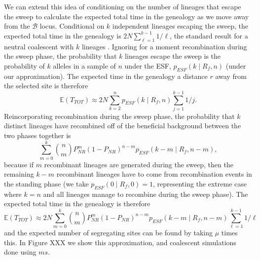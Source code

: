 \documentclass[a4paper,10pt]{article}
\newcommand{\fancyB}{$\mathcal B$ }
\begin{document}
We can extend this idea of conditioning on the number of lineages that escape the sweep to calculate the expected total time in the genealogy as we move away from the \fancyB locus. Conditional on  $k$ independent lineages escaping the sweep, the expected total time in the genealogy is $2N \sum_{\ell=1}^{k-1} 1/\ell$, the standard result for a neutral coalescent with $k$ lineages \citep{Watterson}. Ignoring for a moment recombination during the sweep phase, the probability that $k$ lineages escape the sweep is the probability of $k$ alleles in a sample of $n$ under the ESF, $p_{ESF}(k\mid R_f,n)$ (under our approximation). The expected time in the genealogy a distance $r$ away from the selected site is therefore
\begin{equation}
	\mathbb{E}(T_{TOT})  \approx 2N \sum_{k=2}^n p_{ESF}(k\mid R_f,n)   \sum_{j=1}^{k-1} 1/j.
\end{equation}
Reincorporating recombination during the sweep phase, the probability that $k$ distinct lineages have recombined off of the beneficial background between the two phases together is
\begin{equation}
	\sum_{m=0}^{k} {n \choose m} P_{NR}^{m} (1-P_{NR})^{n-m} p_{ESF}\left(k-m\mid R_f, n-m\right),
\end{equation}
because if $m$ recombinant lineages are generated during the sweep, then the remaining $k-m$ recombinant lineages have to come from recombination events in the standing phase (we take $p_{ESF}\left(0 \mid R_f,0\right)=1$, representing the extreme case where $k=n$ and all lineages manage to recombine during the sweep phase). The expected total time in the genealogy is therefore
\begin{equation}
	\mathbb{E}(T_{TOT})  \approx 2N\sum_{m=0}^{k} {n \choose m} P_{NR}^{m} (1-P_{NR})^{n-m} p_{ESF}\left(k-m\mid R_f, n-m\right)   \sum_{\ell=1}^{k-1} 1/\ell
\end{equation}
and the expected number of segregating sites can be found by taking $\mu$ times this. In Figure XXX we show this approximation, and coalescent simulations done using $ms$. 
\end{document}
